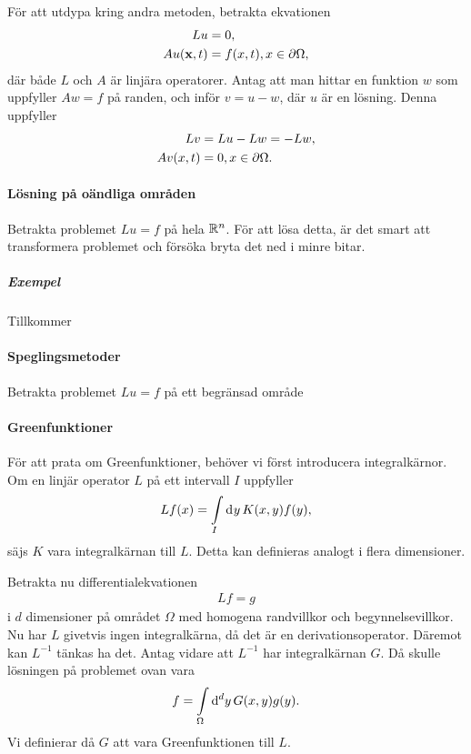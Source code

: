 För att utdypa kring andra metoden, betrakta ekvationen
\begin{align*}
	Lu            &= 0, \\
	Au(\vb{x}, t) &= f(x, t), x\in\partial \Omega,
\end{align*}
där både $L$ och $A$ är linjära operatorer. Antag att man hittar en funktion $w$ som uppfyller $Aw = f$ på randen, och inför $v = u - w$, där $u$ är en lösning. Denna uppfyller
\begin{align*}
	Lv       &= Lu - Lw = -Lw, \\
	Av(x, t) &= 0, x\in\partial \Omega.
\end{align*}

\paragraph{Lösning på oändliga områden}
Betrakta problemet $Lu = f$ på hela $\mathbb{R}^{n}$. För att lösa detta, är det smart att transformera problemet och försöka bryta det ned i minre bitar.

\subparagraph{Exempel}
Tillkommer

\paragraph{Speglingsmetoder}
Betrakta problemet $Lu = f$ på ett begränsad område

\paragraph{Greenfunktioner}
För att prata om Greenfunktioner, behöver vi först introducera integralkärnor. Om en linjär operator $L$ på ett intervall $I$ uppfyller
\begin{align*}
	Lf(x) = \int\limits_{I}\dd[]{y}K(x, y)f(y),
\end{align*}
säjs $K$ vara integralkärnan till $L$. Detta kan definieras analogt i flera dimensioner.

Betrakta nu differentialekvationen
\begin{align*}
	Lf = g
\end{align*}
i $d$ dimensioner på området $\Omega$ med homogena randvillkor och begynnelsevillkor. Nu har $L$ givetvis ingen integralkärna, då det är en derivationsoperator. Däremot kan $L^{-1}$ tänkas ha det. Antag vidare att $L^{-1}$ har integralkärnan $G$. Då skulle lösningen på problemet ovan vara
\begin{align*}
	f = \int\limits_{\Omega}\dd[d]{y}G(x, y)g(y).
\end{align*}
Vi definierar då $G$ att vara Greenfunktionen till $L$.


